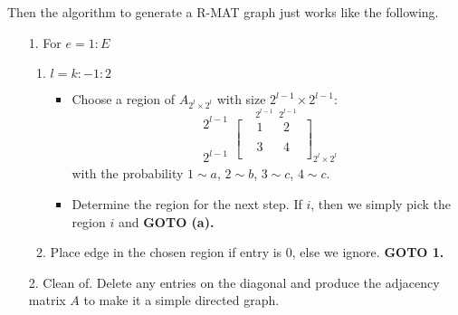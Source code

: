 Then the algorithm to generate a R-MAT graph just works like the following.
\begin{enumerate}
	\item[1.] For \(e = 1 : E\)
		\begin{enumerate}
			\item \(l = k: -1 : 2\)
			      \begin{itemize}
				      \item Choose a region of \(A_{2^l \times 2^l}\) with size \(2^{l-1} \times  2^{l-1}\):
				            \[
					            \substack{2^{l - 1}\\ \\ \\ \\ 2^{l-1}} \overset{\ \ \ 2^{l - 1}\ \ \ 2^{l-1}}{\begin{bmatrix}
							             & 1 &  & 2 & \\
							             &   &  &   & \\
							             & 3 &  & 4 & \\
						            \end{bmatrix}}_{2^l\times 2^l}
				            \]
				            with the probability \(1\sim a\), \(2\sim b\), \(3\sim c\), \(4\sim c\).
				      \item Determine the region for the next step. If \(i\), then we simply pick the region \(i\) and \textbf{GOTO (a).}
			      \end{itemize}
			\item Place edge in the chosen region if entry is \(0\), else we ignore. \textbf{GOTO 1.}
		\end{enumerate}
	\item[2.] Clean of. Delete any entries on the diagonal and produce the adjacency matrix \(A\) to make it a simple directed graph.
\end{enumerate}

